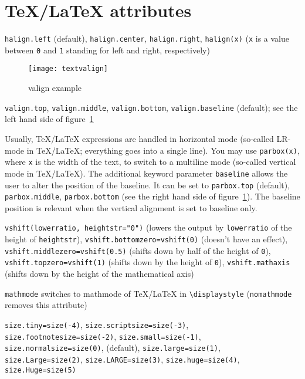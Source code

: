 \section{\TeX/\LaTeX{} attributes}

\begin{description}
\raggedright
\item[Horizontal alignment:] \verb|halign.left| (default),
\verb|halign.center|, \verb|halign.right|, \verb|halign(x)| (\verb|x|
is a value between \verb|0| and \verb|1| standing for left and right,
respectively)
\begin{figure}
\centerline{\texttt{[image: textvalign]}}
\caption{valign example}
\label{fig:textvalign}
\end{figure}
\item[Vertical alignment:] \verb|valign.top|, \verb|valign.middle|,
\verb|valign.bottom|, \verb|valign.baseline| (default); see the left
hand side of figure~\ref{fig:textvalign}
\item[Vertical box:] Usually, \TeX/\LaTeX{} expressions are handled in
horizontal mode (so-called LR-mode in \TeX/\LaTeX; everything goes
into a single line). You may use \verb|parbox(x)|, where \verb|x| is the
width of the text, to switch to a multiline mode (so-called vertical
mode in \TeX/\LaTeX). The additional keyword parameter \verb|baseline|
allows the user to alter the position of the baseline. It can be set
to \verb|parbox.top| (default), \verb|parbox.middle|,
\verb|parbox.bottom| (see the right hand side of
figure~\ref{fig:textvalign}). The baseline position is relevant when
the vertical alignment is set to baseline only.
\item[Vertical shift:] \verb|vshift(lowerratio, heightstr="0")|
(lowers the output by \verb|lowerratio| of the height of
\verb|heightstr|), \verb|vshift.bottomzero=vshift(0)| (doesn't have an
effect), \verb|vshift.middlezero=vshift(0.5)| (shifts down by half of
the height of \verb|0|), \verb|vshift.topzero=vshift(1)| (shifts down
by the height of \verb|0|), \verb|vshift.mathaxis| (shifts down by the
height of the mathematical axis)
\item[Mathmode:] \verb|mathmode| switches to mathmode of \TeX/\LaTeX{}
in \verb|\displaystyle| (\verb|nomathmode| removes this attribute)
\item[Font size:] \verb|size.tiny=size(-4)|,
\verb|size.scriptsize=size(-3)|, \verb|size.footnotesize=size(-2)|,
\verb|size.small=size(-1)|, \verb|size.normalsize=size(0)|,
(default), \verb|size.large=size(1)|, \verb|size.Large=size(2)|,
\verb|size.LARGE=size(3)|, \verb|size.huge=size(4)|,
\verb|size.Huge=size(5)|
\end{description}

